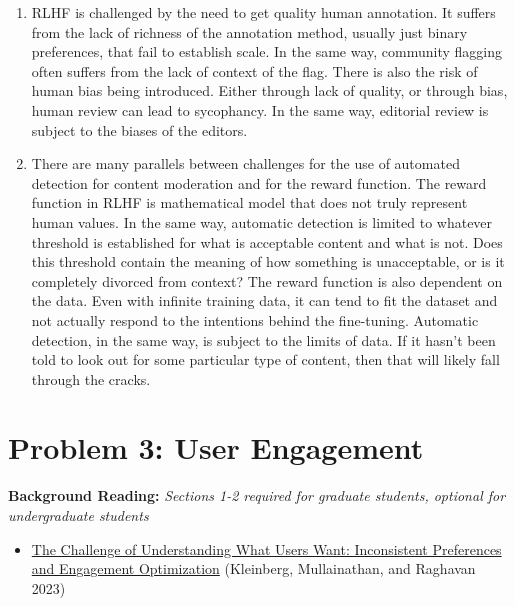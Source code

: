 \documentclass{article}
\begin{document}
\bigskip

\begin{mdframed}
\begin{enumerate}[label=\Alph*.]
    \item RLHF is challenged by the need to get quality human annotation. It suffers from the lack of richness of the annotation method, usually just binary preferences, that fail to establish scale. In the same way, community flagging often suffers from the lack of context of the flag. There is also the risk of human bias being introduced. Either through lack of quality, or through bias, human review can lead to sycophancy. In the same way, editorial review is subject to the biases of the editors. 
    \item There are many parallels between challenges for the use of automated detection for content moderation and for the reward function. The reward function in RLHF is mathematical model that does not truly represent human values. In the same way, automatic detection is limited to whatever threshold is established for what is acceptable content and what is not. Does this threshold contain the meaning of how something is unacceptable, or is it completely divorced from context? The reward function is also dependent on the data. Even with infinite training data, it can tend to fit the dataset and not actually respond to the intentions behind the fine-tuning. Automatic detection, in the same way, is subject to the limits of data. If it hasn't been told to look out for some particular type of content, then that will likely fall through the cracks.
\end{enumerate}
\end{mdframed}
\bigskip

\clearpage

\section*{Problem 3: User Engagement}

\textbf{Background Reading:} \textit{Sections 1-2 required for graduate students, optional for undergraduate students}
\begin{itemize}
\item \href{https://pubsonline.informs.org/doi/full/10.1287/mnsc.2022.03683}{The Challenge of Understanding What Users Want: Inconsistent Preferences and Engagement Optimization} (Kleinberg, Mullainathan, and Raghavan 2023)
\end{itemize}
\end{document}
